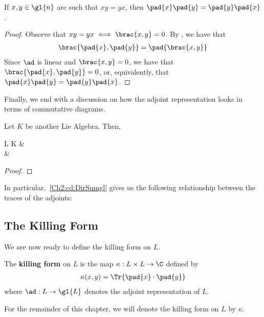 \begin{lemma}
    If $x, y \in \gl{n}$ are such that $xy = yx$, then $\pad{x} \pad{y} = \pad{y} \pad{x}$.
\end{lemma}
\begin{proof}
    Observe that $xy = yx \iff \brac{x, y} = 0$. By , we have that
    \begin{align*}
        \brac{\pad{x}, \pad{y}} = \pad{\brac{x, y}}
    \end{align*}
    Since $\ad$ is linear and $\brac{x, y} = 0$, we have that $\brac{\pad{x}, \pad{y}} = 0$, or, equivalently, that $\pad{x} \pad{y} = \pad{y} \pad{x}$.
\end{proof}

Finally, we end with a discussion on how the adjoint representation looks in terms of commutative diagrams.

\begin{boxproposition}
    Let $K$ be another Lie Algebra. Then,
    \begin{cd}
        L \+ K \arrow[r, "\ad_{L \+ K}"] \arrow[rd, "\ad_{L} \+ \ad_{K}"'] &  \\
        &  \+  \arrow[u, hook]
        \label{Ch2:cd:DirSumgl}
    \end{cd}
\end{boxproposition}
\begin{proof}
    \sorry
\end{proof}

In particular,~\eqref{Ch2:cd:DirSumgl} gives us the following relationship between the traces of the adjoints: \sorry

\subsection{The Killing Form}

We are now ready to define the killing form on $L$.

\begin{boxdefinition}
    The \textbf{killing form} on $L$ is the map $\kappa : L \times L \to \C$ defined by
    \begin{align}
        \kappa(x, y) = \Tr{\pad{x} \cdot \pad{y}}
    \end{align}
    where $\ad : L \to \gl{L}$ denotes the adjoint representation of $L$.
\end{boxdefinition}

\begin{boxconvention}
    For the remainder of this chapter, we will denote the killing form on $L$ by $\kappa$.
\end{boxconvention}

